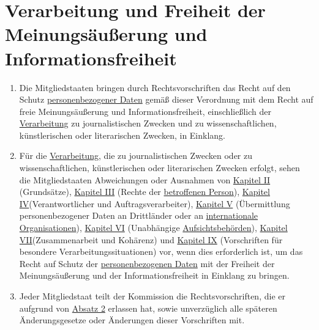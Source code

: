 \chapter{Verarbeitung und Freiheit der Meinungsäußerung und Informationsfreiheit}
\label{ch:85}


\begin{enumerate}

  \item Die Mitgliedstaaten bringen durch Rechtsvorschriften das Recht auf den Schutz \hyperref[itm:04-1]{personenbezogener Daten} gemäß
   dieser Verordnung mit dem Recht auf freie Meinungsäußerung und Informationsfreiheit, einschließlich der \hyperref[itm:04-2]{Verarbeitung}
   zu journalistischen Zwecken und zu wissenschaftlichen, künstlerischen oder literarischen Zwecken, in Einklang.
  \label{itm:85-1}

  \item Für die \hyperref[itm:04-2]{Verarbeitung}, die zu journalistischen Zwecken oder zu wissenschaftlichen, künstlerischen oder
   literarischen Zwecken erfolgt, sehen die Mitgliedstaaten Abweichungen oder Ausnahmen von \hyperref[part:2]
   {Kapitel II} (Grundsätze), \hyperref[part:3]{Kapitel III} (Rechte der \hyperref[itm:04-1]{betroffenen Person}), \hyperref[part:4]
   {Kapitel IV}(Verantwortlicher und Auftragsverarbeiter), \hyperref[part:5]{Kapitel V} (Übermittlung personenbezogener
   Daten an Drittländer oder an \hyperref[itm:04-29]{internationale Organisationen}), \hyperref[part:6]{Kapitel VI}
   (Unabhängige \hyperref[itm:04-21]{Aufsichtsbehörden}), \hyperref[part:7]{Kapitel VII}(Zusammenarbeit und Kohärenz) und \hyperref[part:9]
   {Kapitel IX} (Vorschriften für besondere Verarbeitungssituationen) vor, wenn dies erforderlich ist, um das Recht auf
   Schutz der \hyperref[itm:04-1]{personenbezogenen Daten} mit der Freiheit der Meinungsäußerung und der Informationsfreiheit in Einklang zu
   bringen.
  \label{itm:85-2}

  \item Jeder Mitgliedstaat teilt der Kommission die Rechtsvorschriften, die er aufgrund von \hyperref[itm:85-2]
   {Absatz 2} erlassen hat, sowie unverzüglich alle späteren Änderungsgesetze oder Änderungen dieser Vorschriften mit.
  \label{itm:85-3}

\end{enumerate}


